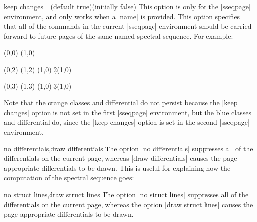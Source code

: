 \documentclass{ltxdoc}
\begin{document}
\begin{sseqdata}[name=ex1,degree={#1}{1-#1}]
\begin{key}{keep changes= (default true)(initially false)}
This option is only for the |sseqpage| environment, and only works when a |name| is provided.
This option specifies that all of the commands in the current |sseqpage| environment should be carried forward to future pages of the same named spectral sequence. For example:
\begin{codeexample}[]
\begin{sseqdata}[name=keep changes example,Adams grading,y range={0}{3}]
\class(0,0)
\class(1,0)
\end{sseqdata}

\begin{sseqpage}[name=keep changes example,paths=orange]
\class(0,2)
\class(1,2)
\classoptions[orange](1,0)
\d2(1,0)
\end{sseqpage}
%
\hskip1cm
%
\begin{sseqpage}[name=keep changes example,paths=blue,keep changes]
\class(0,3)
\class(1,3)
\classoptions[blue](1,0)
\d3(1,0)
\end{sseqpage}
%
\hskip1cm
%
\printpage[name=keep changes example,page=3]
\end{codeexample}
Note that the orange classes and differential do not persist because the |keep changes| option is not set in the first |sseqpage| environment, but the blue classes and differential do, since the |keep changes| option is set in the second |sseqpage| environment.
\end{key}

\begin{keylist}{no differentials,draw differentials}
The option |no differentials| suppresses all of the differentials on the current page, whereas |draw differentials| causes the page appropriate differentials to be drawn. This is useful for explaining how the computation of the spectral sequence goes:
\end{keylist}

\begin{keylist}{no struct lines,draw struct lines}
The option |no struct lines| suppresses all of the differentials on the current page, whereas the option |draw struct lines| causes the page appropriate differentials to be drawn.
\end{keylist}


\end{sseqdata}
\end{document}
